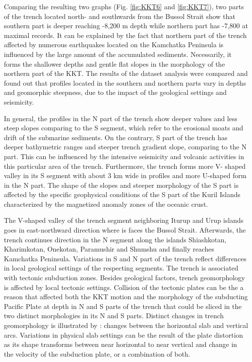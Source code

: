 \documentclass[11pt,a4paper]{report}
\begin{document}
{Comparing the resulting two graphs (Fig. \ref{fig:KKT6} and \ref{fig:KKT7}), two parts of the trench located north- and southwards from the Bussol Strait show that southern part is deeper reaching -8,200 m depth while northern part has -7,800 at maximal records. It can be explained by the fact that northern part of the trench affected by numerous earthquakes located on the Kamchatka Peninsula is influenced by the large amount of the accumulated sediments. Necessarily, it forms the shallower depths and gentle flat slopes in the morphology of the northern part of the \ac{KKT}. The results of the dataset analysis were compared and found out that profiles located in the southern and northern parts vary in depths and geomorphic steepness, due to the impact of the geological settings and seismicity. 

In general, the profiles in the N part of the trench show deeper values and less steep slopes comparing to the S segment, which refer to the erosional moats and drift of the submarine sediments. On the contrary, S part of the trench has deeper bathymetric ranges and steeper trench gradient slope, comparing to the N part. This can be influenced by the intensive seismicity and volcanic activities in this particular area of the trench. Furthermore, the trench forms more V- shaped valley in its S segment with about 3 km wide in profiles and more U-shaped form in the N part. The shape of the slopes and steeper morphology of the S part is affected by the specific geophysical conditions of the S part of the Kuril Islands characterized by the magnetized anomaly zones of the oceanic crust. 

The V-shaped valley of the trench segment neighboring Iturup and Urup islands goes in east-northward direction where is faces the Bussol Strait. Afterwards, the trench continues direction in the N segment along the islands Shiashkotan, Kharimkotan, Onekotan, Paramushir and Shumshu and finally reaches Kamchatka Peninsula. Variations in S and N part of the trench reflect differences in local geological settings of the respecting segments. The trench is associated with tectonic subduction zones. Besides geological factors, trench geomorphology is affected by local tectonic settings. Collision of the tectonic plates can be the a reason that affected both the \ac{KKT} motion and the morphology of the subducting Pacific Plate at depth in N and S parts of the trench that could be sliced in the two distinct morphologies in its N and S parts. Distinct changes in trench geomorphology is illustrated by \cite{Milleretal2005}: changes between the horizontal slab and vertical arcs. Variations in physical slab settings can be the result of the plate distortion as its shape transforms between near horizontal to near vertical and change in the velocity of the subduction plate, or a combination of both. 

}
\end{document}
